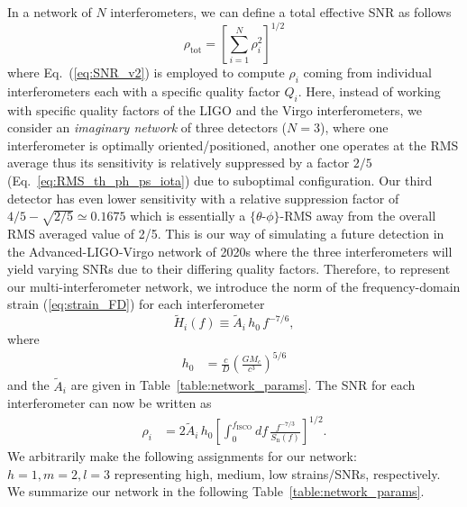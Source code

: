 \documentclass[11pt,a4paper]{article}
\newcommand{\f}{\frac}
\newcommand{\be}{\begin{equation}}
\newcommand{\ee}{\end{equation}}
\begin{document}
In a network of $N$ interferometers, we can define a total effective SNR as follows
%
\be
\rho_\text{tot} = \left[{\sum_{i=1}^N \rho^2_i}\right]^{1/2} \label{eq:SNR_total}
\ee
%
where Eq.~(\ref{eq:SNR_v2}) is employed to compute $\rho_i$ coming from individual interferometers each with a specific quality factor $Q_i$.
Here, instead of working with specific quality factors of the LIGO and the Virgo interferometers, we consider
an \emph{imaginary network} of three detectors ($N=3$), where one interferometer is optimally oriented/positioned, another one operates at the RMS average thus
its sensitivity is relatively suppressed by a factor $2/5$ (Eq.~\ref{eq:RMS_th_ph_ps_iota}) due to suboptimal configuration.
Our third detector has even lower sensitivity with a relative suppression factor of $4/5-\sqrt{2/5}\simeq 0.1675$ which is essentially a $\{\theta$-$\phi\}$-RMS away
from the overall RMS averaged value of 2/5.
This is our way of simulating a future detection in the Advanced-LIGO-Virgo network of 2020s where the three interferometers will yield varying SNRs
due to their differing quality factors.
%
Therefore, to represent our multi-interferometer network, we introduce the norm of the frequency-domain strain (\ref{eq:strain_FD}) for each interferometer
%
\be
\tilde{H}_i(f)\equiv \tilde{A}_i\, h_0\, f^{-7/6}, \label{eq:Hi_s}
\ee
%
where
%
\begin{align}
h_0 &= \f{c}{D}\left(\f{G M_c}{c^3}\right)^{5/6} \label{eq:h0}
\end{align}
%
and the $\tilde{A}_i$ are given in Table~\ref{table:network_params}. %
The SNR for each interferometer can now be written as
%
\begin{align}
\rho_i &= 2\tilde{A}_i\, h_0 \left[\int_0^{f_\text{ISCO}} df\, \f{f^{-7/3}}{S_\text{n}(f)} \right]^{1/2}\label{eq:SNR_i}.
\end{align}
%
We arbitrarily make the following assignments for our network: $h=1, m=2, l=3$ representing high, medium, low strains/SNRs, respectively. 
We summarize our network in the following Table~\ref{table:network_params}.
\end{document}
